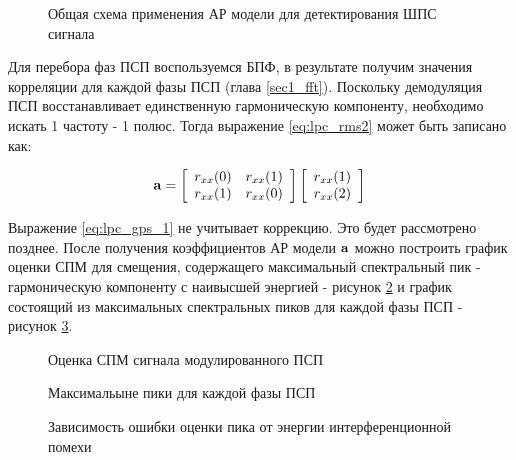 \begin{figure}[H]
	\center{}
	\caption{Общая схема применения АР модели для детектирования ШПС сигнала}
	\label{pic:lpc_basic}
\end{figure}
Для перебора фаз ПСП воспользуемся БПФ, в результате получим значения корреляции для каждой фазы ПСП (глава \ref{sec1_fft}).
Поскольку демодуляция ПСП восстанавливает единственную гармоническую компоненту, необходимо искать 1 частоту - 1 полюс.
Тогда выражение \ref{eq:lpc_rms2} может быть записано как:
\begin{center}
\begin{equation}
	\label{eq:lpc_gps_1}
	{\bf a} = 
		\left[ \begin{array}{cc}
			r_{xx}(0) & r_{xx}(1) \\
			r_{xx}(1) & r_{xx}(0)
		\end{array} \right]
		\left[ \begin{array}{c}
			r_{xx}(1) \\
			r_{xx}(2)
		\end{array} \right]
\end{equation}
\end{center}

Выражение \ref{eq:lpc_gps_1} не учитывает коррекцию. Это будет рассмотрено позднее. После получения коэффициентов АР модели
${\bf{a}}$ можно построить график оценки СПМ для смещения, содержащего максимальный спектральный пик - гармоническую компоненту
с наивысшей энергией - рисунок \ref{pic:lpc_psd_1} и график состоящий из максимальных спектральных пиков для каждой фазы
ПСП - рисунок \ref{pic:lpc_1sat_energy}.

\begin{figure}[H]
	\center{}
	\caption{Оценка СПМ сигнала модулированного ПСП}
	\label{pic:lpc_psd_1}
\end{figure}
\begin{figure}[H]
	\center{}
	\caption{Максимальыне пики для каждой фазы ПСП}
	\label{pic:lpc_1sat_energy}
\end{figure}

\begin{figure}[H]
	\center{}
	\caption{Зависимость ошибки оценки пика от энергии интерференционной помехи}
	\label{pic:lpc_1sat}
\end{figure}

